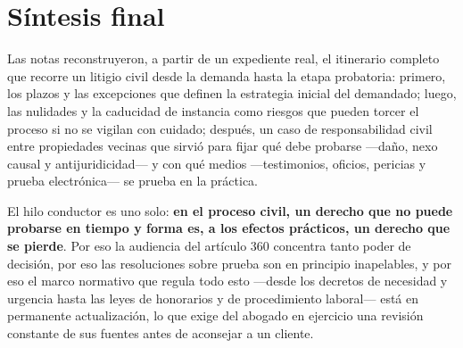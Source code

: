 \documentclass[12pt,oneside]{book}
\begin{document}
\chapter*{Síntesis final}

Las notas reconstruyeron, a partir de un expediente real, el itinerario completo que recorre un litigio civil desde la demanda hasta la etapa probatoria: primero, los plazos y las excepciones que definen la estrategia inicial del demandado; luego, las nulidades y la caducidad de instancia como riesgos que pueden torcer el proceso si no se vigilan con cuidado; después, un caso de responsabilidad civil entre propiedades vecinas que sirvió para fijar qué debe probarse ---daño, nexo causal y antijuridicidad--- y con qué medios ---testimonios, oficios, pericias y prueba electrónica--- se prueba en la práctica.

El hilo conductor es uno solo: \textbf{en el proceso civil, un derecho que no puede probarse en tiempo y forma es, a los efectos prácticos, un derecho que se pierde}. Por eso la audiencia del artículo 360 concentra tanto poder de decisión, por eso las resoluciones sobre prueba son en principio inapelables, y por eso el marco normativo que regula todo esto ---desde los decretos de necesidad y urgencia hasta las leyes de honorarios y de procedimiento laboral--- está en permanente actualización, lo que exige del abogado en ejercicio una revisión constante de sus fuentes antes de aconsejar a un cliente.
\end{document}
